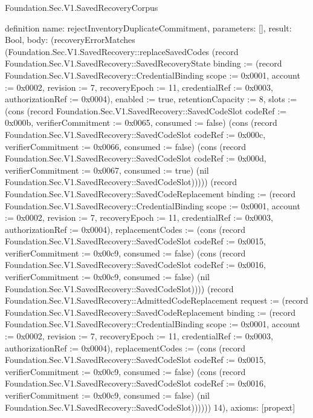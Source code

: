 \begin{lexlean}{Foundation.Sec.V1.SavedRecoveryCorpus}
\begin{semanticmodule}
definition{
  name: rejectInventoryDuplicateCommitment,
  parameters: [],
  result: Bool,
  body: (recoveryErrorMatches (Foundation.Sec.V1.SavedRecovery::replaceSavedCodes (record Foundation.Sec.V1.SavedRecovery::SavedRecoveryState {binding := (record Foundation.Sec.V1.SavedRecovery::CredentialBinding {scope := 0x0001, account := 0x0002, revision := 7, recoveryEpoch := 11, credentialRef := 0x0003, authorizationRef := 0x0004}), enabled := true, retentionCapacity := 8, slots := (cons (record Foundation.Sec.V1.SavedRecovery::SavedCodeSlot {codeRef := 0x000b, verifierCommitment := 0x0065, consumed := false}) (cons (record Foundation.Sec.V1.SavedRecovery::SavedCodeSlot {codeRef := 0x000c, verifierCommitment := 0x0066, consumed := false}) (cons (record Foundation.Sec.V1.SavedRecovery::SavedCodeSlot {codeRef := 0x000d, verifierCommitment := 0x0067, consumed := true}) (nil Foundation.Sec.V1.SavedRecovery::SavedCodeSlot))))}) (record Foundation.Sec.V1.SavedRecovery::SavedCodeReplacement {binding := (record Foundation.Sec.V1.SavedRecovery::CredentialBinding {scope := 0x0001, account := 0x0002, revision := 7, recoveryEpoch := 11, credentialRef := 0x0003, authorizationRef := 0x0004}), replacementCodes := (cons (record Foundation.Sec.V1.SavedRecovery::SavedCodeSlot {codeRef := 0x0015, verifierCommitment := 0x00c9, consumed := false}) (cons (record Foundation.Sec.V1.SavedRecovery::SavedCodeSlot {codeRef := 0x0016, verifierCommitment := 0x00c9, consumed := false}) (nil Foundation.Sec.V1.SavedRecovery::SavedCodeSlot)))}) (record Foundation.Sec.V1.SavedRecovery::AdmittedCodeReplacement {request := (record Foundation.Sec.V1.SavedRecovery::SavedCodeReplacement {binding := (record Foundation.Sec.V1.SavedRecovery::CredentialBinding {scope := 0x0001, account := 0x0002, revision := 7, recoveryEpoch := 11, credentialRef := 0x0003, authorizationRef := 0x0004}), replacementCodes := (cons (record Foundation.Sec.V1.SavedRecovery::SavedCodeSlot {codeRef := 0x0015, verifierCommitment := 0x00c9, consumed := false}) (cons (record Foundation.Sec.V1.SavedRecovery::SavedCodeSlot {codeRef := 0x0016, verifierCommitment := 0x00c9, consumed := false}) (nil Foundation.Sec.V1.SavedRecovery::SavedCodeSlot)))})})) 14),
  axioms: [propext]
}


\end{semanticmodule}
\end{lexlean}
